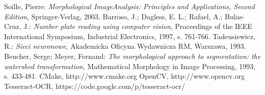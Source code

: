 \documentclass[12pt,a4paper,notitlepage,twoside]{article}
\begin{document}
\begin{thebibliography}{99}
 Soille, Pierre: \emph{Morphological ImageAnalysis: Principles and Applications, Second Edition}, Springer-Verlag, 2003.
 Barroso, J.; Dagless, E. L.; Rafael, A.; Bulas-Cruz, J.: \emph{Number plate reading using computer vision}, Proceedings of the IEEE International Symposium, Industrial Electronics, 1997, s. 761-766.
 Tadeusiewicz, R.: \emph{Sieci neuronowe}, Akademicka Oficyna Wydawnicza RM, Warszawa, 1993.
 Beucher, Serge; Meyer, Fernand: \emph{The morphological approach to segmentation: the watershed transformation}, Mathematical Morphology in Image Processing, 1993, s. 433-481.
 CMake, http://www.cmake.org
 OpenCV, http://www.opencv.org
 Tesseract-OCR, https://code.google.com/p/tesseract-ocr/
\end{thebibliography}
%
%
\end{document}
